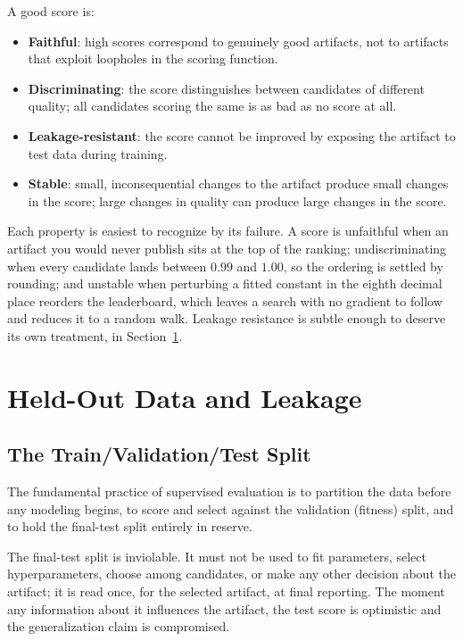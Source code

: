 A good score is:
\begin{itemize}
\item \textbf{Faithful}: high scores correspond to genuinely good artifacts, not to artifacts that exploit loopholes in the scoring function.
\item \textbf{Discriminating}: the score distinguishes between candidates of different quality; all candidates scoring the same is as bad as no score at all.
\item \textbf{Leakage-resistant}: the score cannot be improved by exposing the artifact to test data during training.
\item \textbf{Stable}: small, inconsequential changes to the artifact produce small changes in the score; large changes in quality can produce large changes in the score.
\end{itemize}
Each property is easiest to recognize by its failure.
A score is unfaithful when an artifact you would never publish sits at the top of the ranking; undiscriminating when every candidate lands between $0.99$ and $1.00$, so the ordering is settled by rounding; and unstable when perturbing a fitted constant in the eighth decimal place reorders the leaderboard, which leaves a search with no gradient to follow and reduces it to a random walk.
Leakage resistance is subtle enough to deserve its own treatment, in Section~\ref{section:Leakage}.

\section{Held-Out Data and Leakage}
\label{section:Leakage}

\subsection{The Train/Validation/Test Split}

The fundamental practice of supervised evaluation is to partition the data before any modeling begins, to score and select against the validation (fitness) split, and to hold the final-test split entirely in reserve.

\begin{principle}
\label{principle:TestSplitInviolable}
The final-test split is inviolable.
It must not be used to fit parameters, select hyperparameters, choose among candidates, or make any other decision about the artifact; it is read once, for the selected artifact, at final reporting.
The moment any information about it influences the artifact, the test score is optimistic and the generalization claim is compromised.
\end{principle}

